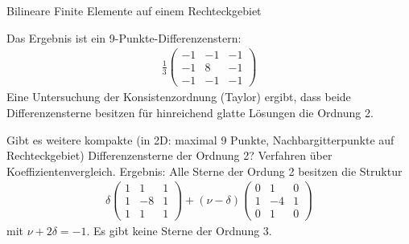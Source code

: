 \begin{beispiel} Bilineare Finite Elemente auf einem Rechteckgebiet

Das Ergebnis ist ein 9-Punkte-Differenzenstern:
\begin{align*}
  \frac 13
  \begin{pmatrix}
    -1 &-1&-1\\
    -1 & 8&-1\\
    -1 &-1&-1
  \end{pmatrix}
\end{align*}
Eine Untersuchung der Konsistenzordnung (Taylor) ergibt, dass beide Differenzensterne besitzen für hinreichend glatte Lösungen die Ordnung 2. 

Gibt es weitere kompakte (in 2D: maximal 9 Punkte, Nachbargitterpunkte auf Rechteckgebiet) Differenzensterne der Ordnung 2? Verfahren über Koeffizientenvergleich. Ergebnis: Alle Sterne der Ordung 2 besitzen die Struktur 
\begin{align*}
  \delta
  \begin{pmatrix}
    1 & 1 & 1\\
    1 & -8 & 1\\    
    1 & 1 & 1
  \end{pmatrix}
+ (\nu - \delta) 
  \begin{pmatrix}
    0 & 1 & 0\\
    1 & -4 & 1\\    
    0 & 1 & 0
  \end{pmatrix}
\end{align*}
mit $\nu + 2 \delta = -1$. Es gibt keine Sterne der Ordnung 3.
\end{beispiel}